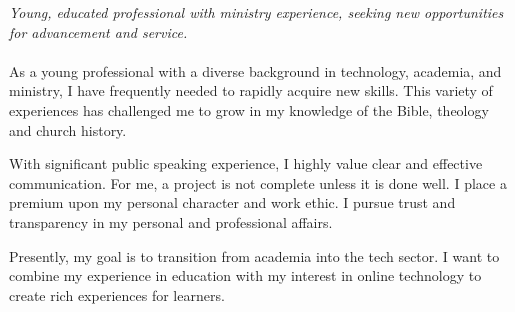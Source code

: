 
\vspace{-1.3em} %

\begin{multicols}{2}  %
\noindent \textit{Young, educated professional with ministry experience, seeking new opportunities for advancement and service.}\\\\

As a young professional with a diverse background in technology, academia, and ministry, I have frequently needed to rapidly acquire new skills. This variety of experiences has challenged me to grow in my knowledge of the Bible, theology and church history.

With significant public speaking experience, I highly value clear and effective communication. For me, a project is not complete unless it is done well. I place a premium upon my personal character and work ethic. I pursue trust and transparency in my personal and professional affairs.

Presently, my goal is to transition from academia into the tech sector. I want to combine my experience in education with my interest in online technology to create rich experiences for learners.

\end{multicols}


